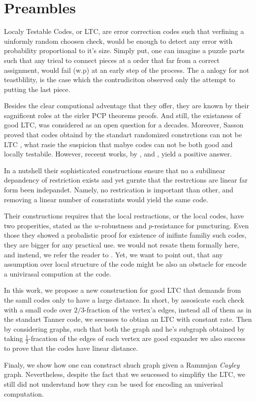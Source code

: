 \section{Preambles}

Localy Testable Codes, or LTC, are error correction codes such that verfining a uinformly random choosen check, would be enough to detect any error with probability proportional to it's size. Simply put, one can imagine a puzzle parts such that any trieal to connect pieces at a order that far from a correct assignment, would fail (w.p) at an early step of the process. The a anlogy for not teastblility, is the case which the contrudiciton observed only the attempt to putting the last piece.     

Besides the clear computional adventage that they offer, they are known by their sagnificent roles at the eirler PCP theorems proofs. And still, the existaness of good LTC, was considered as an open question for a decades. Moreover, Sasson proved that codes obtaind by the standart randomized constrctions can not be LTC \cite{Sasson}, what rasie the suspicion that mabye codes can not be both good and locally testabile. However, receent works, by \cite{Dinur}, \cite{Pavel} and \cite{leverrier2022quantum}, yield a positive answer.

In a nutshell their sophisticated constructions ensure that no a subilinear depandency of restriction exists and yet gurnte that the restrctions are linear far form been indepandet. Namely, no restrication is important than other, and removing a linear number of consratints would yield the same code.  

Their constructions requires that the local restractions, or the local codes, have two properities, stated as the $w$-robustness and $p$-resistance for puncturing. Even those they showed a probalistic proof for existence of inifinte familiy such codes, they are bigger for any practical use. we would not resate them formally here, and instend, we refer the reader to \cite{leverrier2022quantum}. Yet, we want to point out, that any assumption over local structure of the code might be also an obstacle for encode a univirasal compution at the code. 

In this work, we propose a new construction for good LTC that demands from the samll codes only to have a large distance. In short, by assosicate each check with a small code over $2/3$-fraction of the vertex'a edges, instead all of them as in the standart Tanner code, we secusses to obtian an LTC with constant rate. Then by considering graphs, such that both the graph and he's subgraph obtained by taking $\frac{1}{2}$-fracation of the edges of each vertex are good expander we also success to prove that the codes have linear distance. 

Finaly, we show how one can constract shuch graph given a Ramnujan \emph{Cayley} graph. Nevertheless, despite the fact that we seucessed to simplifiy the LTC, we still did not understand how they can be used for encoding an univerisal computation.  

